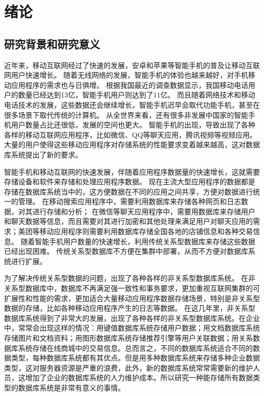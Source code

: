 
\chapter{绪论}
\section{研究背景和研究意义}
近年来，移动互联网经过了快速的发展，安卓和苹果等智能手机的普及让移动互联网用户快速增长。
随着无线网络的发展，智能手机的体验也越来越好，对手机移动应用程序的需求也与日俱增。
根据我国最近的调查数据显示，我国移动电话用户的数量已经达到13亿，智能手机用户则达到了11亿。
而且随着网络技术和移动电话技术的发展，这些数据还会继续增长，智能手机迟早会取代功能手机，甚至在很多场景下取代传统的计算机。
从全世界来看，还有很多非发展中国家的智能手机用户数量占比还很低，发展的空间也更大。
智能手机的出现，导致出现了各种各样的移动互联网应用程序，比如微信、QQ等聊天应用，腾讯视频等视频应用。
大量的用户使得这些移动应用程序对存储系统的性能要求变着越来越高，这对数据库系统提出了新的要求。

智能手机和移动互联网的快速发展，伴随着应用程序数据量的快速增长，这就需要存储设备和软件来存储和处理应用程序数据。
现在主流大型应用程序的数据都是存储在数据库系统当中的，这方便数据在不同的应用之间共享，方便对数据进行统一的管理。
在移动搜索应用程序中，需要利用数据库来存储各种网页和日志数据，对其进行存储和分析；
在微信等聊天应用程序中，需要用数据库来存储用户和聊天数据等信息，而且需要对其进行加密和其他处理来满足用户对聊天应用的需求；美团等移动应用程序则需要利用数据库存储全国各地的店铺信息和各种交易信息。
随着智能手机用户数量的快速增长，利用传统关系型数据库来存储这些数据已经出现困难。
传统关系型数据库不方便在集群中部署，从而不方便对数据库系统进行扩展。

为了解决传统关系型数据的问题，出现了各种各样的非关系型数据库系统。
在非关系型数据库中，数据库不再满足强一致性和事务要求，更加重视互联网集群的可扩展性和性能的需求，更加适合大量移动应用程序数据存储场景，特别是非关系型数据的存储，比如各种移动应用程序产生的日志等数据。
在这几年里，非关系型数据库系统得到了非常大的发展，出现了各种各样的非关系型数据库系统。在企业中，常常会出现这样的情况：用键值数据库系统存储用户数据；用文档数据库系统存储图片和文档资料；用图形数据库系统存储推荐引擎等用户关联数据；用关系数据库系统存储在线商城中的交易信息。总而言之，不同的数据库系统适合不同的数据类型，每种数据库系统都有其优点。但是用多种数据库系统来存储多种企业数据类型，这对服务器资源是严重的浪费，此外，新的数据库系统常常需要新的维护人员，这增加了企业的数据库系统的人力维护成本。所以研究一种能存储所有数据类型的数据库系统是非常有意义的事情。

